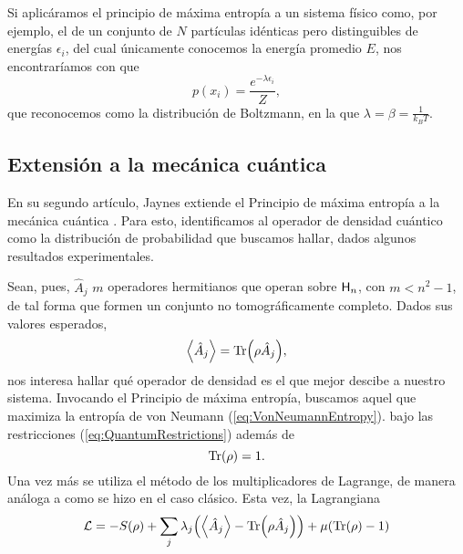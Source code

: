 Si aplicáramos el principio de máxima entropía a un sistema físico  como, por ejemplo, el de un conjunto de $N$ partículas idénticas pero distinguibles de energías $\epsilon_{i}$, del cual únicamente conocemos la energía promedio $E$, nos encontraríamos con que
\begin{equation}\label{eq:Boltzman}
    p(x_{i})=\frac{e^{-\lambda\epsilon_{i}}}{Z},
\end{equation}
que reconocemos como la distribución de Boltzmann, en la que $\lambda=\beta=\frac{1}{k_{B}T}$. 
\subsection{Extensión a la mecánica cuántica}

En su segundo artículo, Jaynes extiende el Principio de máxima entropía a la mecánica cuántica \cite{JaynesII}. Para esto, identificamos al operador de densidad cuántico como la distribución de probabilidad que buscamos hallar, dados algunos resultados experimentales.

Sean, pues, $\hat{A}_{j}$ $m$ operadores hermitianos que operan sobre ${\sf H}_{n}$, con $m<n^{2}-1$, de tal forma que formen un conjunto no tomográficamente completo. Dados sus valores esperados,
\begin{equation}\label{eq:QuantumRestrictions}
    \expval{\hat{A}_{j}}=\Tr(\rho \hat{A}_{j}),
\end{equation} 
nos interesa hallar qué operador de densidad es el que mejor descibe a nuestro sistema. Invocando el Principio de máxima entropía, buscamos aquel que maximiza la entropía de von Neumann (\ref{eq:VonNeumannEntropy}). bajo las restricciones (\ref{eq:QuantumRestrictions}) además de
\begin{equation}\label{eq:TraceRestriction}
    \Tr(\rho)=1.
\end{equation}
Una vez más se utiliza el método de los multiplicadores de Lagrange, de manera análoga a como se hizo en el caso clásico. Esta vez, la Lagrangiana
\begin{equation*}
    \mathcal{L}=-S(\rho)+\sum_{j}\lambda_{j}\qty(\expval{\hat{A}_{j}}-\Tr(\rho \hat{A}_{j}))+\mu\qty(\Tr(\rho)-1)
\end{equation*}


